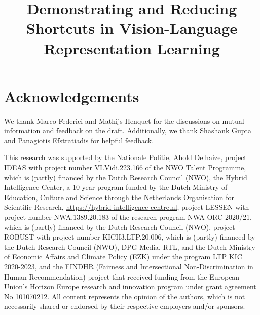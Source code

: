 \documentclass[preprint, 10pt]{article}
\title{Demonstrating and Reducing Shortcuts in Vision-Language Representation Learning}
\begin{document}
\maketitle

\begin{abstract}

\end{abstract}


\acresetall














\section*{Acknowledgements}
We thank Marco Federici and Mathijs Henquet for the discussions on mutual information and feedback on the draft. Additionally, we thank Shashank Gupta and Panagiotis Efstratiadis for helpful feedback. 

This research was supported by the Nationale Politie, Ahold Delhaize, project IDEAS with project number VI.Vidi.223.166 of the NWO Talent Programme, which is (partly) financed by the Dutch Research Council (NWO), the Hybrid Intelligence Center, a 10-year program funded by the Dutch Ministry of Education, Culture and Science through the Netherlands Organisation for Scientific Research, \url{https://hybrid-intelligence-centre.nl}, project LESSEN with project number NWA.1389.20.183 of the research program NWA ORC 2020/21, which is (partly) financed by the Dutch Research Council (NWO), project ROBUST with project number KICH3.LTP.20.006, which is (partly) financed by the Dutch Research Council (NWO), DPG Media, RTL, and the Dutch Ministry of Economic Affairs and Climate Policy (EZK) under the program LTP KIC 2020-2023, and the FINDHR (Fairness and Intersectional Non-Discrimination in Human Recommendation) project that received funding from the European Union’s Horizon Europe research and innovation program under grant agreement No 101070212.
All content represents the opinion of the authors, which is not necessarily shared or endorsed by their respective employers and/or sponsors.

  


\appendix

\end{document}
